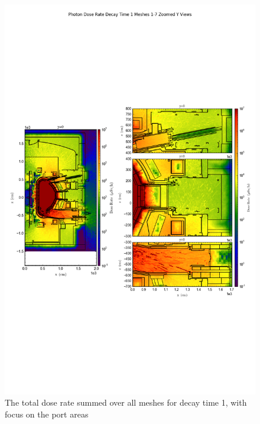 \documentclass[12pt]{article}
\begin{document}
\begin{figure}[ht!]
\centering
\includegraphics[trim={0cm 9cm 0cm 10cm},clip,scale=0.75]{../plots/final_model_with_b4c/Photon_Dose_Rate_Decay_Time_1_Meshes_1-7_Zoomed_Y_Views.png}
\caption{The total dose rate summed over all meshes for decay time 1, with focus on the port areas}
\label{fig:photons_dc1_b4c_total_zoomed}
\end{figure}
\end{document}

